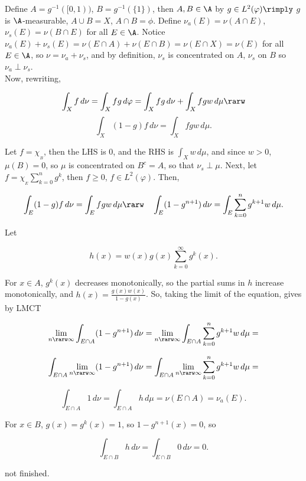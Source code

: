 \noindent
Define $A = g^{-1} ([0,1))$, $B = g^{-1}( \{ 1 \})$, then $A,B \in \A$ by $g \in L^2(\varphi) \rimply$ $g$ is $\A$-measurable, $A \cup B = X$, $A \cap B = \phi$. Define $\nu_a(E) = \nu(A \cap E)$, $\nu_s(E) = \nu(B \cap E)$ for all $E \in \A$. Notice $\nu_a(E) + \nu_s(E) = \nu(E \cap A) + \nu(E \cap B) = \nu(E \cap X) = \nu(E)$ for all $E \in \A$, so $\nu = \nu_a +\nu_s$, and by definition, $\nu_s$ is concentrated on $A$, $\nu_s$ on $B$ so $\nu_a \perp \nu_s$. \\


\noindent
Now, rewriting,

$$
\int_X f \, d\nu = \int_X fg \, d\varphi =  \int_X  fg \, d\nu  +  \int_X  fgw \, d\mu \rarw 
$$
$$
 \int_X (1-g) f \, d\nu = \int_X fgw \, d\mu.
$$

\noindent

Let $f = \chi_{_B}$, then the LHS is $0$, and the RHS is $\int_X w \, d\mu$, and since $w > 0$, $\mu(B) = 0$, so $\mu$ is concentrated on $B^c = A$, so that $\nu_s \perp \mu$. Next, let $ f = \chi_{_E}  \sum_{k=0}^n g^k$, then $f \ge 0$, $f \in L^2(\varphi)$. Then,

$$
    \int_E (1-g) f \, d\nu = \int_E fgw \, d\mu \rarw \hspace{10pt} \int_E (1-g^{n+1}) \, d\nu = \int_E \sum_{k=0}^n g^{k+1} w \, d\mu.
$$

\noindent Let 

$$
h(x) = w(x)  g(x)\sum_{k=0}^\infty g^{k}(x).
$$

\noindent 
For $x \in A$, $g^k(x)$ decreases monotonically, so the partial sums in $h$ increase monotonically, and $ h(x) = \frac{g(x) w(x)}{1-g(x)}$. So, taking the limit of the equation, gives by LMCT 

$$
\lim_{n \rarw \infty}  \int_{E \cap A} (1-g^{n+1}) \, d\nu =  \lim_{n \rarw \infty}  \int_{E \cap A} \sum_{k=0}^n g^{k+1} w \, d\mu =
$$

$$
\int_{E \cap A}  \lim_{n \rarw \infty}  (1-g^{n+1}) \, d\nu =  \int_{E \cap A} \lim_{n \rarw \infty}   \sum_{k=0}^n g^{k+1} w \, d\mu =
$$

$$
\int_{E \cap A} 1 \, d\nu =  \int_{E \cap A} h \, d\mu = \nu(E \cap A) = \nu_a(E).
$$


\noindent 
For $x \in B$, $g(x) = g^k(x) = 1$, so $1-g^{n+1}(x) = 0$, so

$$
\int_{E \cap B} h \, d\nu = \int_{E \cap B} 0 \, d\nu = 0.
$$

\noindent
not finished.




